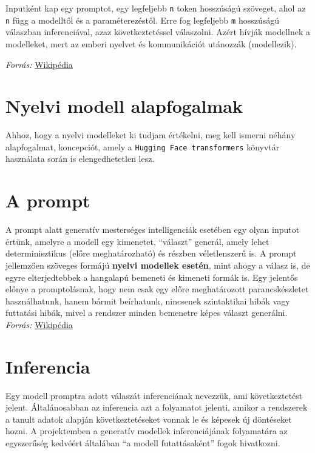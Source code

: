 \documentclass[12pt]{report}
\begin{document}
    Inputként kap egy promptot, egy legfeljebb \texttt{\allowbreak n} token hosszúságú szöveget, ahol az \texttt{\allowbreak n} függ a modelltől és a paraméterezéstől. Erre fog legfeljebb \texttt{\allowbreak m} hosszúságú válaszban inferenciával, azaz következtetéssel válaszolni. Azért hívják modellnek a modelleket, mert az emberi nyelvet és kommunikációt utánozzák (modellezik).

    \textit{ Forrás:} \href{https://hu.wikipedia.org/wiki/Nagy_nyelvi_modell}{Wikipédia}


    \section*{Nyelvi modell alapfogalmak}

    Ahhoz, hogy a nyelvi modelleket ki tudjam értékelni, meg kell ismerni néhány alapfogalmat, koncepciót, amely a \texttt{\allowbreak Hugging Face transformers} könyvtár használata során is elengedhetetlen lesz.


    \section{A prompt}
    A prompt alatt generatív mesterséges intelligenciák esetében egy olyan inputot értünk, amelyre a modell egy kimenetet, ``választ'' generál, amely lehet determinisztikus (előre meghatározható) és részben véletlenszerű is.
    A prompt jellemzően szöveges formájú \textbf{nyelvi modellek esetén}, mint ahogy a válasz is, de egyre elterjedtebbek a hangalapú bemeneti és kimeneti formák is.
    Egy jelentős előnye a promptolásnak, hogy nem csak egy előre meghatározott parancskészletet használhatunk, hanem bármit beírhatunk, nincsenek szintaktikai hibák vagy futtatási hibák, mivel a rendszer minden bemenetre képes választ generálni.\\
    \textit{ Forrás:} \href{https://hu.wikipedia.org/wiki/Nagy_nyelvi_modell}{Wikipédia}


    \section{Inferencia}
    Egy modell promptra adott válaszát inferenciának nevezzük, ami következtetést jelent.
    Általánosabban az inferencia azt a folyamatot jelenti, amikor a rendszerek a tanult adatok alapján következtetéseket vonnak le és képesek új döntéseket hozni.
    A projektemben a generatív modellek inferenciájának folyamatára az egyszerűség kedvéért általában ``a modell futattásaként'' fogok hivatkozni.
\end{document}
